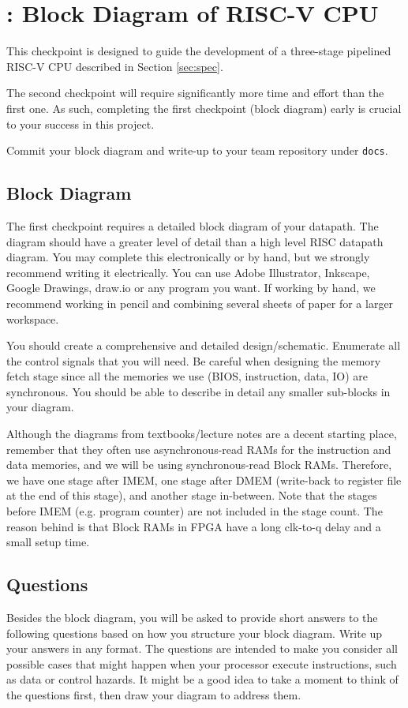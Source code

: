 \section{\blockDiagramTaskName: Block Diagram of RISC-V CPU}

This checkpoint is designed to guide the development of a three-stage pipelined RISC-V CPU
described in Section \ref{sec:spec}.

The second checkpoint will require significantly more time and effort than the first one.
As such, completing the first checkpoint (block diagram) early is crucial to your success in this project.

Commit your block diagram and write-up to your team repository under \verb|docs|.


\subsection{Block Diagram}
The first checkpoint requires a detailed block diagram of your datapath.
The diagram should have a greater level of detail than a high level RISC datapath diagram.
You may complete this electronically or by hand,
but we strongly recommend writing it electrically.
You can use Adobe Illustrator, Inkscape, Google Drawings, draw.io or any program you want.
If working by hand, we recommend working in pencil and combining several sheets of paper for a larger workspace.

You should create a comprehensive and detailed design/schematic.
Enumerate all the control signals that you will need.
Be careful when designing the memory fetch stage
since all the memories we use (BIOS, instruction, data, IO) are synchronous.
You should be able to describe in detail any smaller sub-blocks in your diagram.

Although the diagrams from textbooks/lecture notes are a decent starting place,
remember that they often use asynchronous-read RAMs for the instruction and data memories,
and we will be using synchronous-read Block RAMs.
Therefore, we have one stage after IMEM,
one stage after DMEM (write-back to register file at the end of this stage),
and another stage in-between.
Note that the stages before IMEM (e.g. program counter) are not included in the stage count.
The reason behind is that Block RAMs in FPGA have a long clk-to-q delay and a small setup time.


\subsection{Questions}
Besides the block diagram, you will be asked to provide short answers to the following questions based on how you structure your block diagram.
Write up your answers in any format.
The questions are intended to make you consider all possible cases that might happen when your processor execute instructions, such as data or control hazards.
It might be a good idea to take a moment to think of the questions first, then draw your diagram to address them.


